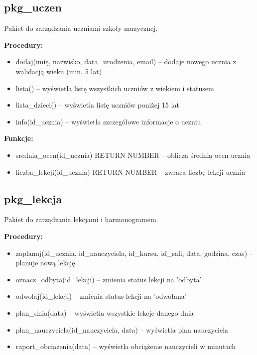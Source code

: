 \documentclass[12pt,a4paper]{article}
\begin{document}
\subsection{pkg\_uczen}

Pakiet do zarządzania uczniami szkoły muzycznej.

\textbf{Procedury:}
\begin{itemize}[nosep]
    \item dodaj(imię, nazwisko, data\_urodzenia, email) -- dodaje nowego ucznia z walidacją wieku (min. 5 lat)
    \item lista() -- wyświetla listę wszystkich uczniów z wiekiem i statusem
    \item lista\_dzieci() -- wyświetla listę uczniów poniżej 15 lat
    \item info(id\_ucznia) -- wyświetla szczegółowe informacje o uczniu
\end{itemize}

\textbf{Funkcje:}
\begin{itemize}[nosep]
    \item srednia\_ocen(id\_ucznia) RETURN NUMBER -- oblicza średnią ocen ucznia
    \item liczba\_lekcji(id\_ucznia) RETURN NUMBER -- zwraca liczbę lekcji ucznia
\end{itemize}

\subsection{pkg\_lekcja}

Pakiet do zarządzania lekcjami i harmonogramem.

\textbf{Procedury:}
\begin{itemize}[nosep]
    \item zaplanuj(id\_ucznia, id\_nauczyciela, id\_kursu, id\_sali, data, godzina, czas) -- planuje nową lekcję
    \item oznacz\_odbyta(id\_lekcji) -- zmienia status lekcji na 'odbyta'
    \item odwolaj(id\_lekcji) -- zmienia status lekcji na 'odwołana'
    \item plan\_dnia(data) -- wyświetla wszystkie lekcje danego dnia
    \item plan\_nauczyciela(id\_nauczyciela, data) -- wyświetla plan nauczyciela
    \item raport\_obciazenia(data) -- wyświetla obciążenie nauczycieli w minutach
\end{itemize}
\end{document}
